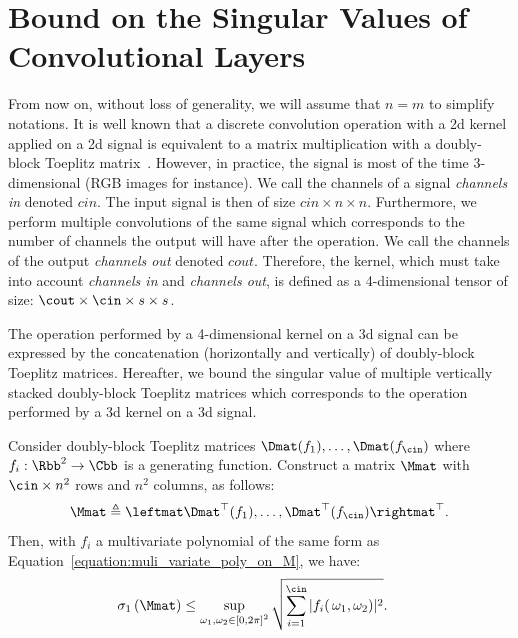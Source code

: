 \section{Bound on the Singular Values of Convolutional Layers}
\label{section:bound_lipschitz_cst_conv}

From now on, without loss of generality, we will assume that $n=m$ to simplify notations.
It is well known that a discrete convolution operation with a 2d kernel applied on a 2d signal is equivalent to a matrix multiplication with a doubly-block Toeplitz matrix~\cite{jain1989fundamentals}.
However, in practice, the signal is most of the time 3-dimensional (RGB images for instance).
We call the channels of a signal \emph{channels in} denoted $cin$.
The input signal is then of size $cin \times n \times n$.
Furthermore, we perform multiple convolutions of the same signal which corresponds to the number of channels the output will have after the operation.
We call the channels of the output \emph{channels out} denoted $cout$.
Therefore, the kernel, which must take into account \emph{channels in} and \emph{channels out}, is defined as a 4-dimensional tensor of size: $\cout \times \cin \times s \times s$. 

The operation performed by a 4-dimensional kernel on a 3d signal can be expressed by the concatenation (horizontally and vertically) of doubly-block Toeplitz matrices.
Hereafter, we bound the singular value of multiple vertically stacked doubly-block Toeplitz matrices which corresponds to the operation performed by a 3d kernel on a 3d signal.

\begin{theorem} \label{theorem:bound_sv_stacked_dbt} 
Consider doubly-block Toeplitz matrices $\Dmat(f_1), \dots, \Dmat(f_{\cin})$ where $f_i: \Rbb^2 \rightarrow \Cbb$ is a generating function.
Construct a matrix $\Mmat$ with $\cin\times n^2$ rows and $n^2$ columns, as follows:
\begin{equation}
  \Mmat \triangleq \leftmat \Dmat^\top(f_1), \dots, \Dmat^\top(f_{\cin}) \rightmat^\top .
\end{equation}
Then, with $f_i$ a multivariate polynomial of the same form as Equation~\ref{equation:muli_variate_poly_on_M}, we have:
\begin{align} \label{equation:bound_asymptotic_equiv}
  \sigma_1 \left( \Mmat \right) &\leq \sup_{\omega_1, \omega_2 \in \left[0, 2\pi\right]^2} \sqrt{ \sum_{i=1}^{\cin} \left|f_i\right (\omega_1, \omega_2)|^2} .
\end{align}
\end{theorem}


